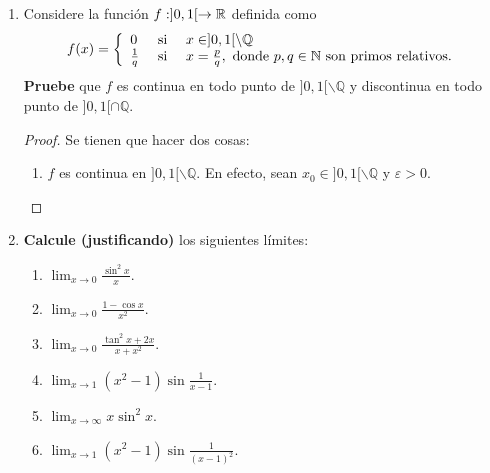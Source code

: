 \documentclass[12pt]{article}
\begin{document}
\begin{enumerate}
    \begin{proof}
        Notemos que
        \begin{equation*}
            f(0+0)=f(0)+f(0)\Rightarrow f(0)=2f(0)\Rightarrow f(0)=0
        \end{equation*}
        ahora, sea $a=f(1)$. Se tiene que
        \begin{equation*}
            f(2)=f(1+1)=2f(1)=a\cdot 2
        \end{equation*}
        Suponga que $f(k)=a\cdot k$ para algún $k\in\mathbb{N}$, se tiene entonces que
        \begin{equation*}
            f(k+1)=f(k)+f(1)=a\cdot k+a=a\cdot (k+1)
        \end{equation*}
        por inducción se sigue que $f(x)=ax$ para todo $x\in\mathbb{N}$.
    \end{proof}

    \item Considere la función $f:]0,1[\rightarrow\mathbb{R}$ definida como
    \begin{equation*}
        f(x)=\left\{\begin{array}{lcl}
            0 & \textup{ si } & x\in]0,1[\backslash\mathbb{Q}\\
            \frac{1}{q} & \textup{ si } & x=\frac{p}{q}, \textup{ donde }p,q\in\mathbb{N}\textup{ son primos relativos.}
        \end{array} \right.
    \end{equation*}
    \textbf{Pruebe} que $f$ es continua en todo punto de $]0,1[\backslash\mathbb{Q}$ y discontinua en todo punto de $]0,1[\cap\mathbb{Q}$.

    \begin{proof}
        Se tienen que hacer dos cosas:
        \begin{enumerate}
            \item $f$ es continua en $]0,1[\backslash\mathbb{Q}$. En efecto, sean $x_0\in]0,1[\backslash\mathbb{Q}$ y $\varepsilon>0$.
        \end{enumerate}
    \end{proof}

    \item \textbf{Calcule (justificando)} los siguientes límites:
    \begin{enumerate}
        \item $\lim_{x\rightarrow0}\frac{\sin^2x}{x}$.
        \item $\lim_{x\rightarrow0}\frac{1-\cos x}{x^2}$.
        \item $\lim_{x\rightarrow0}\frac{\tan^2x+2x}{x+x^2}$.
        \item $\lim_{x\rightarrow1}(x^2-1)\sin\frac{1}{x-1}$.
        \item $\lim_{x\rightarrow\infty}x\sin^2x$.
        \item $\lim_{x\rightarrow1}(x^2-1)\sin\frac{1}{(x-1)^2}$.
    \end{enumerate}


\end{enumerate}
\end{document}
